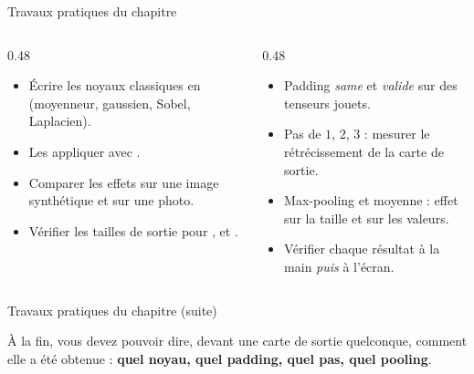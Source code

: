 \begin{frame}{Travaux pratiques du chapitre}
\begin{columns}[t]
\begin{column}{0.48\textwidth}
\begin{abox}
\begin{itemize}
  \item Écrire les noyaux classiques en  (moyenneur, gaussien,
  Sobel, Laplacien).
  \item Les appliquer avec .
  \item Comparer les effets sur une image synthétique et sur une photo.
  \item Vérifier les tailles de sortie pour ,
   et .
\end{itemize}
\end{abox}
\end{column}
\begin{column}{0.48\textwidth}
\begin{abox}
\begin{itemize}
  \item Padding \emph{same} et \emph{valide} sur des tenseurs jouets.
  \item Pas de $1$, $2$, $3$ : mesurer le rétrécissement de la carte de
  sortie.
  \item Max-pooling et moyenne : effet sur la taille et sur les valeurs.
  \item Vérifier chaque résultat à la main \emph{puis} à l'écran.
\end{itemize}
\end{abox}
\end{column}
\end{columns}
\vspace{1mm}

\end{frame}
\begin{frame}{Travaux pratiques du chapitre (suite)}
\begin{kbox}
À la fin, vous devez pouvoir dire, devant une carte de sortie quelconque,
comment elle a été obtenue : \textbf{quel noyau, quel padding, quel pas,
quel pooling}.
\end{kbox}
\end{frame}
